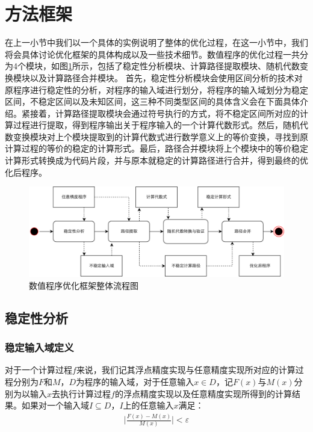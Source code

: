 \section{方法框架}
在上一小节中我们以一个具体的实例说明了整体的优化过程，在这一小节中，我们将会具体讨论优化框架的具体构成以及一些技术细节。数值程序的优化过程一共分为4个模块，如图\ref{fig:mainframe}所示，包括了稳定性分析模块、计算路径提取模块、随机代数变换模块以及计算路径合并模块。
首先，稳定性分析模块会使用区间分析的技术对原程序进行稳定性的分析，对程序的输入域进行划分，将程序的输入域划分为稳定区间，不稳定区间以及未知区间，这三种不同类型区间的具体含义会在下面具体介绍。紧接着，计算路径提取模块会通过符号执行的方式，将不稳定区间所对应的计算过程进行提取，得到程序输出关于程序输入的一个计算代数形式。然后，随机代数变换模块对上个模块提取到的计算代数式进行数学意义上的等价变换，寻找到原计算过程的等价的稳定的计算形式。最后，路径合并模块将上个模块中的等价稳定计算形式转换成为代码片段，并与原本就稳定的计算路径进行合并，得到最终的优化后程序。

\begin{figure}[thbp]
  \centering
 \includegraphics[width=\textwidth]{fig/MainFramework.pdf}
  \caption{数值程序优化框架整体流程图} \label{fig:mainframe}
\end{figure}

\subsection{稳定性分析}

\subsubsection{稳定输入域定义}
对于一个计算过程$f$来说，我们记其浮点精度实现与任意精度实现所对应的计算过程分别为$F$和$M$，$D$为程序的输入域，对于任意输入$x \in D$，记$F(x)$与$M(x)$分别为以输入$x$去执行计算过程$f$的浮点精度实现以及任意精度实现所得到的计算结果。如果对一个输入域$I \subseteq D$，$I$上的任意输入$x$满足：
\begin{align*}
  \Big|\frac{F(x)-M(x)}{M(x)}\Big| < \varepsilon
\end{align*}

